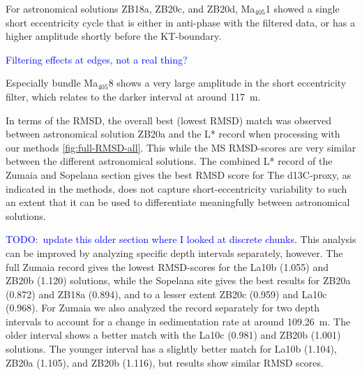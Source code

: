 \documentclass[draft]{agujournal2019}
\newcommand{\ijk}{\textcolor{blue}}
\newcommand{\ma}[1]{Ma\(_{405}\)#1}
\begin{document}
For astronomical solutions ZB18a, ZB20c, and ZB20d, \ma{1} showed a single short eccentricity cycle that is either in anti-phase with the filtered data, or has a higher amplitude shortly before the \gls{KT}-boundary.

\ijk{Filtering effects at edges, not a real thing?}


Especially bundle \ma{8} shows a very large amplitude in the short eccentricity filter, which relates to the darker interval at around \qty{117}{\metre}.


In terms of the \gls{RMSD}, the overall best (lowest \gls{RMSD}) match was observed between astronomical solution ZB20a and the \gls{L*} record when processing with our methods \cref{fig:full-RMSD-all}.
This while the \gls{MS}
\gls{RMSD}-scores are very similar between the different astronomical solutions.
The combined \gls{L*} record of the Zumaia and Sopelana section gives the best \gls{RMSD} score for
The \gls{d13C}-proxy, as indicated in the methods, does not capture short-eccentricity variability to such an extent that it can be used to differentiate meaningfully between astronomical solutions.

\ijk{TODO:\ update this older section where I looked at discrete chunks.}
This analysis can be improved by analyzing specific depth intervals separately, however.
The full Zumaia record gives the lowest \gls{RMSD}-scores for the La10b (\num{1.055}) and ZB20b (\num{1.120}) solutions,
while the Sopelana site gives the best results for ZB20a (\num{0.872}) and ZB18a (\num{0.894}), and to a lesser extent ZB20c (\num{0.959}) and La10c (\num{0.968}).
For Zumaia we also analyzed the record separately for two depth intervals to account for a change in sedimentation rate at around \qty{109.26}{\metre}.
The older interval shows a better match with the La10c (\num{0.981}) and ZB20b (1.001) solutions.
The younger interval has a slightly better match for La10b (\num{1.104}), ZB20a (\num{1.105}), and ZB20b (\num{1.116}), but results show similar \gls{RMSD} scores.
\end{document}
